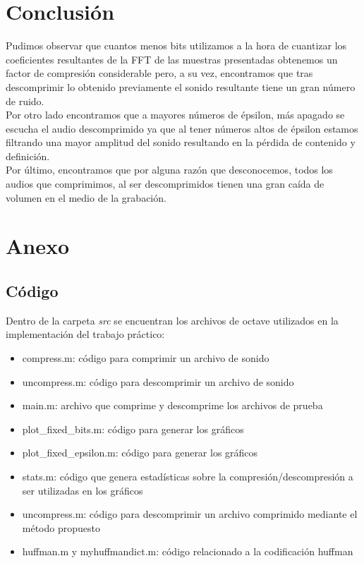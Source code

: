\documentclass[spanish]{scrartcl}
\begin{document}
\pagebreak

\section{Conclusión}
Pudimos observar que cuantos menos bits utilizamos a la hora de cuantizar los coeficientes resultantes de la FFT de las muestras presentadas obtenemos un factor de compresión considerable pero, a su vez, encontramos que tras descomprimir lo obtenido previamente el sonido resultante tiene un gran número de ruido. \\
Por otro lado encontramos que a mayores números de épsilon, más apagado se escucha el audio descomprimido ya que al tener números altos de épsilon estamos filtrando una mayor amplitud del sonido resultando en la pérdida de contenido y definición. \\
Por último, encontramos que por alguna razón que desconocemos, todos los audios que comprimimos, al ser descomprimidos tienen una gran caída de volumen en el medio de la grabación. 

\section{Anexo}
\subsection{Código}
Dentro de la carpeta \textit{src} se encuentran los archivos de octave utilizados en la implementación del trabajo práctico:
\begin{itemize}
    \item compress.m: código para comprimir un archivo de sonido
    \item uncompress.m: código para descomprimir un archivo de sonido
    \item main.m: archivo que comprime y descomprime los archivos de prueba
    \item plot\_fixed\_bits.m: código para generar los gráficos
    \item plot\_fixed\_epsilon.m: código para generar los gráficos
    \item stats.m: código que genera estadísticas sobre la compresión/descompresión a ser utilizadas en los gráficos
    \item uncompress.m: código para descomprimir un archivo comprimido mediante el método propuesto
    \item huffman.m y myhuffmandict.m: código relacionado a la codificación huffman\cite{huffman}

\end{itemize}

\printbibliography
\end{document}
